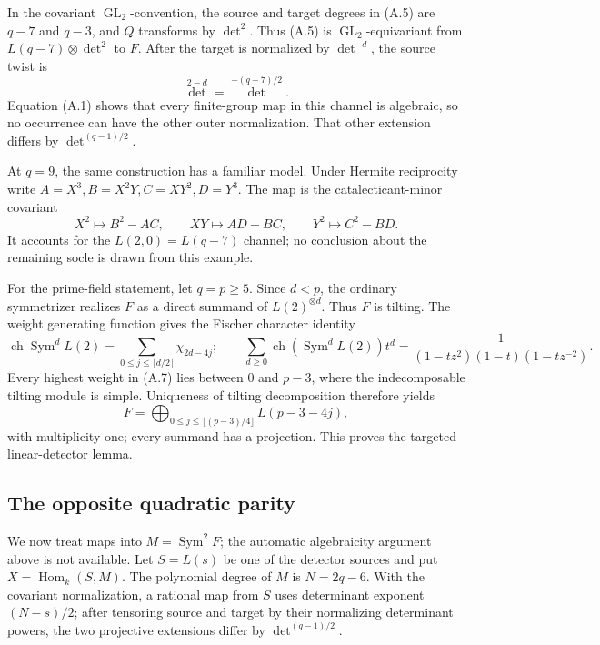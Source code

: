 \documentclass[11pt]{article}
\theoremstyle{definition}
\theoremstyle{remark}
\begin{document}
In the covariant \(\operatorname{GL}_2\)-convention, the source and target
degrees in (A.5) are \(q-7\) and \(q-3\), and \(Q\) transforms by
\(\det^2\).  Thus (A.5) is
\(\operatorname{GL}_2\)-equivariant from
\(L(q-7)\otimes\det^2\) to \(F\).  After the target is normalized by
\(\det^{-d}\), the source twist is
\[
 \det^{2-d}=\det^{-(q-7)/2}.                            \tag{A.6}
\]
Equation (A.1) shows that every finite-group map in this channel is
algebraic, so no occurrence can have the other outer normalization.
That other extension differs by \(\det^{(q-1)/2}\).

At \(q=9\), the same construction has a familiar model.  Under Hermite
reciprocity write \(A=X^3,B=X^2Y,C=XY^2,D=Y^3\).  The map is the
catalecticant-minor covariant
\[
 X^2\longmapsto B^2-AC,\qquad
 XY\longmapsto AD-BC,\qquad
 Y^2\longmapsto C^2-BD.
\]
It accounts for the \(L(2,0)=L(q-7)\) channel; no conclusion about the
remaining socle is drawn from this example.

For the prime-field statement, let \(q=p\ge5\).  Since \(d<p\), the
ordinary symmetrizer realizes \(F\) as a direct summand of
\(L(2)^{\otimes d}\).  Thus \(F\) is tilting.  The weight generating
function gives the Fischer character identity
\[
 \operatorname{ch}\operatorname{Sym}^dL(2)
 =\sum_{0\le j\le\lfloor d/2\rfloor}\chi_{2d-4j};
 \qquad
 \sum_{d\ge0}\operatorname{ch}(\operatorname{Sym}^dL(2))t^d
 =\frac1{(1-tz^2)(1-t)(1-tz^{-2})}.                    \tag{A.7}
\]
Every highest weight in (A.7) lies between \(0\) and \(p-3\), where the
indecomposable tilting module is simple.  Uniqueness of tilting
decomposition therefore yields
\[
 F=\bigoplus_{0\le j\le\lfloor(p-3)/4\rfloor}
 L(p-3-4j),                                             \tag{A.8}
\]
with multiplicity one; every summand has a projection.  This proves the
targeted linear-detector lemma.

\subsection{The opposite quadratic parity}
\label{app:outer-parity-proof}

We now treat maps into \(M=\operatorname{Sym}^2F\); the automatic
algebraicity argument above is not available.  Let \(S=L(s)\) be one of
the detector sources and put \(X=\operatorname{Hom}_k(S,M)\).
The polynomial degree of \(M\) is \(N=2q-6\).  With the covariant
normalization, a rational map from \(S\) uses determinant exponent
\((N-s)/2\); after tensoring source and target by their normalizing
determinant powers, the two projective extensions differ by
\(\det^{(q-1)/2}\).
\end{document}
